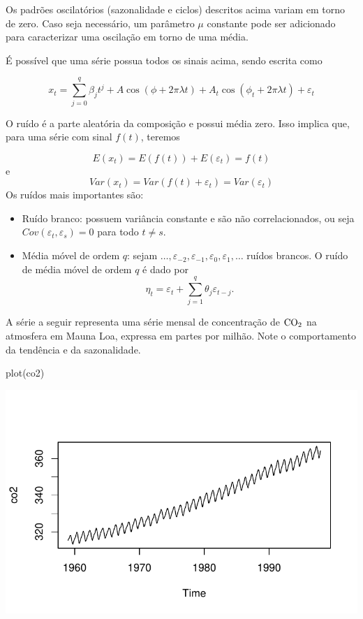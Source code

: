 \documentclass[
  letterpaper,
  DIV=11,
  numbers=noendperiod]{scrreprt}
\newenvironment{Shaded}{\begin{snugshade}}{\end{snugshade}}
\newcommand{\FunctionTok}[1]{\textcolor[rgb]{0.28,0.35,0.67}{#1}}
\newcommand{\NormalTok}[1]{\textcolor[rgb]{0.00,0.23,0.31}{#1}}
\begin{document}
Os padrões oscilatórios (sazonalidade e ciclos) descritos acima variam
em torno de zero. Caso seja necessário, um parâmetro \(\mu\) constante
pode ser adicionado para caracterizar uma oscilação em torno de uma
média.

É possível que uma série possua todos os sinais acima, sendo escrita
como

\[x_t=\sum_{j=0}^q \beta_j t^j+A\cos\left(\phi+2\pi\lambda t\right)+A_t\cos\left(\phi_t+2\pi\lambda t\right)+\varepsilon_t\]

O ruído é a parte aleatória da composição e possui média zero. Isso
implica que, para uma série com sinal \(f(t)\), teremos

\[E(x_t)=E(f(t))+E(\varepsilon_t)=f(t)\] e
\[Var(x_t)=Var(f(t)+\varepsilon_t)=Var(\varepsilon_t)\] Os ruídos mais
importantes são:

\begin{itemize}
\item
  Ruído branco: possuem variância constante e são não correlacionados,
  ou seja \(Cov(\varepsilon_t,\varepsilon_s)=0\) para todo \(t\neq s\).
\item
  Média móvel de ordem \(q\): sejam
  \(\ldots,\varepsilon_{-2},\varepsilon_{-1},\varepsilon_{0},\varepsilon_{1},\ldots\)
  ruídos brancos. O ruído de média móvel de ordem \(q\) é dado por
  \[\eta_t=\varepsilon_{t}+\sum_{j=1}^q \theta_j\varepsilon_{t-j}.\]
\end{itemize}

A série a seguir representa uma série mensal de concentração de
\(\hbox{CO}_2\) na atmosfera em Mauna Loa, expressa em partes por
milhão. Note o comportamento da tendência e da sazonalidade.

\begin{Shaded}
\begin{Highlighting}[]
\FunctionTok{plot}\NormalTok{(co2)}
\end{Highlighting}
\end{Shaded}

\includegraphics{sinal_files/figure-pdf/unnamed-chunk-1-1.pdf}
\end{document}
